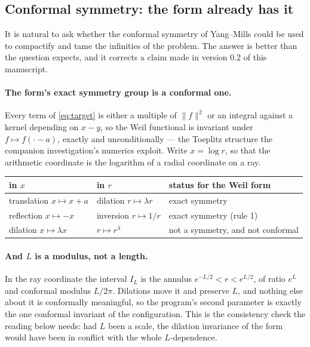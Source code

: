 \subsection{Conformal symmetry: the form already has it}\label{subsec:conformal}

It is natural to ask whether the conformal symmetry of Yang--Mills could be used
to compactify and tame the infinities of the problem. The answer is better than
the question expects, and it corrects a claim made in version 0.2 of this
manuscript.

\paragraph{The form's exact symmetry group is a conformal one.}
Every term of \eqref{eq:target} is either a multiple of $\lVert f\rVert^2$ or an
integral against a kernel depending on $x-y$, so the Weil functional is invariant
under $f\mapsto f(\cdot-a)$, exactly and unconditionally --- the Toeplitz
structure the companion investigation's numerics exploit. Write $x=\log r$, so
that the arithmetic coordinate is the logarithm of a radial coordinate on a ray.

\begin{center}
\begin{tabular}{@{}lll@{}}
\toprule
in $x$ & in $r$ & status for the Weil form\\
\midrule
translation $x\mapsto x+a$ & dilation $r\mapsto\lambda r$ & exact symmetry\\
reflection $x\mapsto-x$ & inversion $r\mapsto1/r$ & exact symmetry (rule 1)\\
dilation $x\mapsto\lambda x$ & $r\mapsto r^\lambda$ & not a symmetry, and not conformal\\
\bottomrule
\end{tabular}
\end{center}

\paragraph{And $L$ is a modulus, not a length.} In the ray coordinate the
interval $I_L$ is the annulus $e^{-L/2}<r<e^{L/2}$, of ratio $e^L$ and conformal
modulus $L/2\pi$. Dilations move it and preserve $L$, and nothing else about it is
conformally meaningful, so the program's second parameter is exactly the one
conformal invariant of the configuration. This is the consistency check the
reading below needs: had $L$ been a scale, the dilation invariance of the form
would have been in conflict with the whole $L$-dependence.

